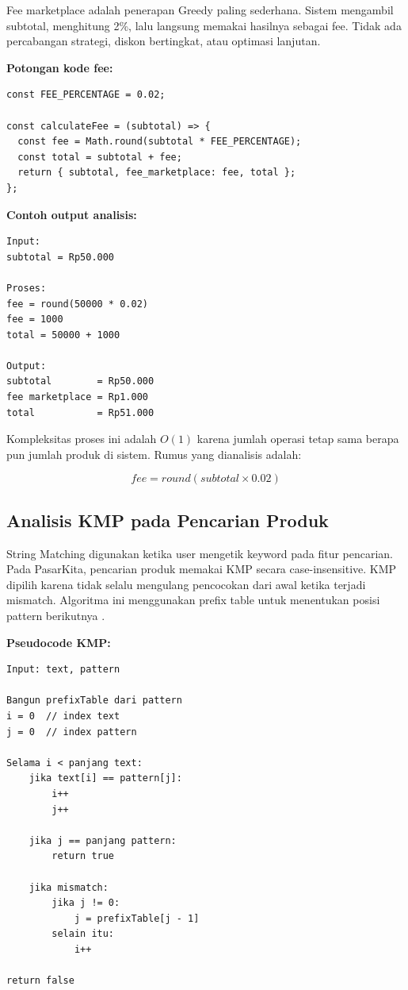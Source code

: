Fee marketplace adalah penerapan Greedy paling sederhana. Sistem mengambil subtotal, menghitung 2\%, lalu langsung memakai hasilnya sebagai fee. Tidak ada percabangan strategi, diskon bertingkat, atau optimasi lanjutan.

\textbf{Potongan kode fee:}

\begin{Verbatim}[frame=single,framesep=6pt,fontsize=\scriptsize]
const FEE_PERCENTAGE = 0.02;

const calculateFee = (subtotal) => {
  const fee = Math.round(subtotal * FEE_PERCENTAGE);
  const total = subtotal + fee;
  return { subtotal, fee_marketplace: fee, total };
};
\end{Verbatim}

\textbf{Contoh output analisis:}

\begin{Verbatim}[frame=single,framesep=6pt,fontsize=\scriptsize]
Input:
subtotal = Rp50.000

Proses:
fee = round(50000 * 0.02)
fee = 1000
total = 50000 + 1000

Output:
subtotal        = Rp50.000
fee marketplace = Rp1.000
total           = Rp51.000
\end{Verbatim}

Kompleksitas proses ini adalah $O(1)$ karena jumlah operasi tetap sama berapa pun jumlah produk di sistem. Rumus yang dianalisis adalah:

\begin{equation}
    fee = round(subtotal \times 0.02)
    \label{eq:fee-marketplace}
\end{equation}

\subsection{Analisis KMP pada Pencarian Produk}

String Matching digunakan ketika user mengetik keyword pada fitur pencarian. Pada PasarKita, pencarian produk memakai KMP secara case-insensitive. KMP dipilih karena tidak selalu mengulang pencocokan dari awal ketika terjadi mismatch. Algoritma ini menggunakan prefix table untuk menentukan posisi pattern berikutnya \parencite{Marbun2024}.

\textbf{Pseudocode KMP:}

\begin{Verbatim}[frame=single,framesep=6pt,fontsize=\scriptsize]
Input: text, pattern

Bangun prefixTable dari pattern
i = 0  // index text
j = 0  // index pattern

Selama i < panjang text:
    jika text[i] == pattern[j]:
        i++
        j++

    jika j == panjang pattern:
        return true

    jika mismatch:
        jika j != 0:
            j = prefixTable[j - 1]
        selain itu:
            i++

return false
\end{Verbatim}

